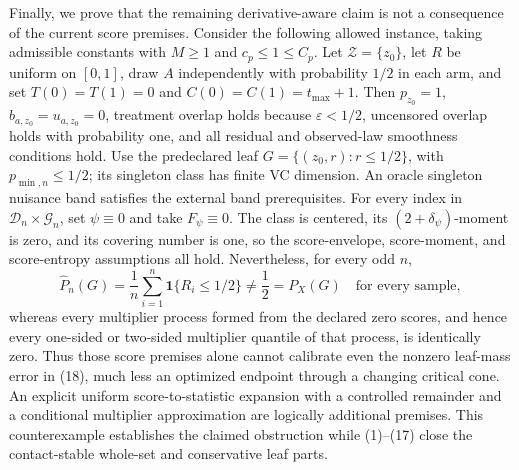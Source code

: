 Finally, we prove that the remaining derivative-aware claim is not a consequence of the current score premises.  Consider the following allowed instance, taking admissible constants with \(M\geq1\) and \(c_p\leq1\leq C_p\).  Let \(\mathcal Z=\{z_0\}\), let \(R\) be uniform on \([0,1]\), draw \(A\) independently with probability \(1/2\) in each arm, and set \(T(0)=T(1)=0\) and \(C(0)=C(1)=t_{\max}+1\).  Then \(p_{z_0}=1\), \(b_{a,z_0}=u_{a,z_0}=0\), treatment overlap holds because \(\varepsilon<1/2\), uncensored overlap holds with probability one, and all residual and observed-law smoothness conditions hold.  Use the predeclared leaf \(G=\{(z_0,r):r\leq1/2\}\), with \(p_{\min,n}\leq1/2\); its singleton class has finite VC dimension.  An oracle singleton nuisance band satisfies the external band prerequisites.  For every index in \(\mathcal D_n\times\mathcal G_n\), set \(\psi\equiv0\) and take \(F_\psi\equiv0\).  The class is centered, its \((2+\delta_\psi)\)-moment is zero, and its covering number is one, so the score-envelope, score-moment, and score-entropy assumptions all hold.  Nevertheless, for every odd \(n\),
\[
\widehat P_n(G)=\frac1n\sum_{i=1}^n\mathbf1\{R_i\leq1/2\}\neq\frac12=P_X(G)
\quad\text{for every sample},
\tag{18}
\]
whereas every multiplier process formed from the declared zero scores, and hence every one-sided or two-sided multiplier quantile of that process, is identically zero.  Thus those score premises alone cannot calibrate even the nonzero leaf-mass error in (18), much less an optimized endpoint through a changing critical cone.  An explicit uniform score-to-statistic expansion with a controlled remainder and a conditional multiplier approximation are logically additional premises.  This counterexample establishes the claimed obstruction while (1)--(17) close the contact-stable whole-set and conservative leaf parts.
